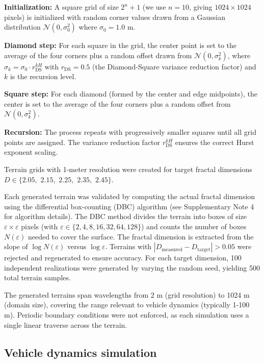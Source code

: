 \documentclass[11pt]{article}
\begin{document}
\textbf{Initialization:} A square grid of size $2^n + 1$ (we use $n = 10$, giving $1024 \times 1024$ pixels) is initialized with random corner values drawn from a Gaussian distribution $\mathcal{N}(0, \sigma_0^2)$ where $\sigma_0 = 1.0$ m.

\textbf{Diamond step:} For each square in the grid, the center point is set to the average of the four corners plus a random offset drawn from $\mathcal{N}(0, \sigma_k^2)$, where $\sigma_k = \sigma_0 \cdot r_{\text{DS}}^{kH}$ with $r_{\text{DS}} = 0.5$ (the Diamond-Square variance reduction factor) and $k$ is the recursion level.

\textbf{Square step:} For each diamond (formed by the center and edge midpoints), the center is set to the average of the four corners plus a random offset from $\mathcal{N}(0, \sigma_k^2)$.

\textbf{Recursion:} The process repeats with progressively smaller squares until all grid points are assigned. The variance reduction factor $r_{\text{DS}}^{kH}$ ensures the correct Hurst exponent scaling.

Terrain grids with 1-meter resolution were created for target fractal dimensions $D \in \{2.05,$ $2.15,$ $2.25,$ $2.35,$ $2.45\}$. 

Each generated terrain was validated by computing the actual fractal dimension using the differential box-counting (DBC) algorithm\cite{Sarkar1994} (see Supplementary Note 4 for algorithm details). The DBC method divides the terrain into boxes of size $\varepsilon \times \varepsilon$ pixels (with $\varepsilon \in \{2, 4, 8, 16, 32, 64, 128\}$) and counts the number of boxes $N(\varepsilon)$ needed to cover the surface. The fractal dimension is extracted from the slope of $\log N(\varepsilon)$ versus $\log \varepsilon$. Terrains with $|D_{\text{measured}} - D_{\text{target}}| > 0.05$ were rejected and regenerated to ensure accuracy. For each target dimension, 100 independent realizations were generated by varying the random seed, yielding 500 total terrain samples.

The generated terrains span wavelengths from 2 m (grid resolution) to 1024 m (domain size), covering the range relevant to vehicle dynamics (typically 1-100 m). Periodic boundary conditions were not enforced, as each simulation uses a single linear traverse across the terrain.

\subsection*{Vehicle dynamics simulation}
\end{document}
